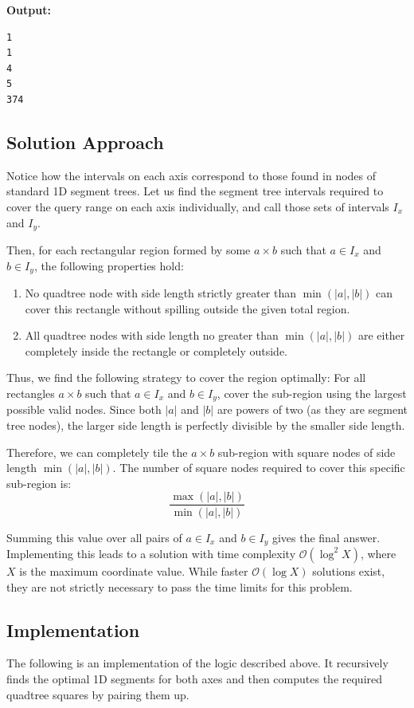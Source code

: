 \textbf{Output:}
\begin{verbatim}
1
1
4
5
374
\end{verbatim}


\subsection*{Solution Approach}
Notice how the intervals on each axis correspond to those found in nodes of standard 1D segment trees. Let us find the segment tree intervals required to cover the query range on each axis individually, and call those sets of intervals $I_x$ and $I_y$.

Then, for each rectangular region formed by some $a \times b$ such that $a \in I_x$ and $b \in I_y$, the following properties hold:
\begin{enumerate}
    \item No quadtree node with side length strictly greater than $\min(|a|, |b|)$ can cover this rectangle without spilling outside the given total region.
    \item All quadtree nodes with side length no greater than $\min(|a|, |b|)$ are either completely inside the rectangle or completely outside.
\end{enumerate}

Thus, we find the following strategy to cover the region optimally:
For all rectangles $a \times b$ such that $a \in I_x$ and $b \in I_y$, cover the sub-region using the largest possible valid nodes. Since both $|a|$ and $|b|$ are powers of two (as they are segment tree nodes), the larger side length is perfectly divisible by the smaller side length. 

Therefore, we can completely tile the $a \times b$ sub-region with square nodes of side length $\min(|a|, |b|)$. The number of square nodes required to cover this specific sub-region is:
$$ \frac{\max(|a|, |b|)}{\min(|a|, |b|)} $$

Summing this value over all pairs of $a \in I_x$ and $b \in I_y$ gives the final answer. Implementing this leads to a solution with time complexity $\mathcal{O}(\log^2 X)$, where $X$ is the maximum coordinate value. While faster $\mathcal{O}(\log X)$ solutions exist, they are not strictly necessary to pass the time limits for this problem.

\subsection*{Implementation}
The following is an implementation of the logic described above. It recursively finds the optimal 1D segments for both axes and then computes the required quadtree squares by pairing them up.

